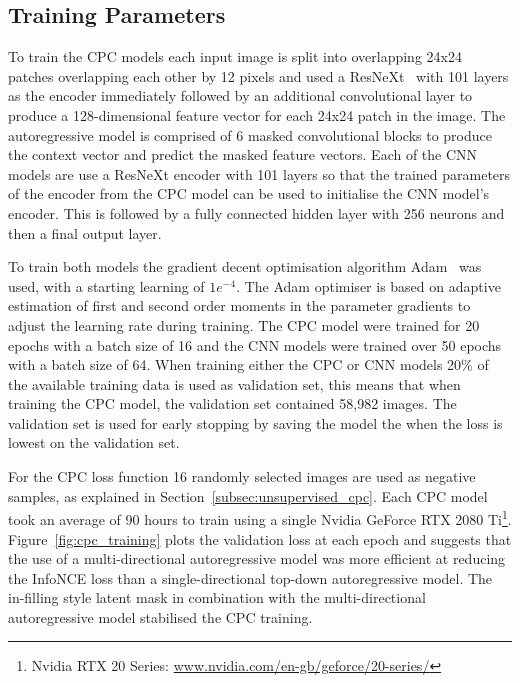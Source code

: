 \subsection{Training Parameters}
\label{subsec:unsupervised_training}
To train the CPC models each input image is split into overlapping 24x24 patches overlapping each other by 12 pixels and used a ResNeXt~\citep{xie2017aggregated} with 101 layers as the encoder immediately followed by an additional convolutional layer to produce a 128-dimensional feature vector for each 24x24 patch in the image. The autoregressive model is comprised of 6 masked convolutional blocks to produce the context vector and predict the masked feature vectors. Each of the CNN models are use a ResNeXt encoder with 101 layers so that the trained parameters of the encoder from the CPC model can be used to initialise the CNN model’s encoder. This is followed by a fully connected hidden layer with 256 neurons and then a final output layer.

To train both models the gradient decent optimisation algorithm Adam~\citep{kingma2014adam} was used, with a starting learning of $1e^{-4}$. The Adam optimiser is based on adaptive estimation of first and second order moments in the parameter gradients to adjust the learning rate during training. The CPC model were trained for 20 epochs with a batch size of 16 and the CNN models were trained over 50 epochs with a batch size of 64. When training either the CPC or CNN models 20\% of the available training data is used as validation set, this means that when training the CPC model, the validation set contained 58,982 images. The validation set is used for early stopping by saving the model the when the loss is lowest on the validation set. 

For the CPC loss function 16 randomly selected images are used as negative samples, as explained in Section~\ref{subsec:unsupervised_cpc}. Each CPC model took an average of 90 hours to train using a single Nvidia GeForce RTX 2080 Ti\footnote{Nvidia RTX 20 Series: \url{www.nvidia.com/en-gb/geforce/20-series/}}. Figure~\ref{fig:cpc_training} plots the validation loss at each epoch and suggests that the use of a multi-directional autoregressive model was more efficient at reducing the InfoNCE loss than a single-directional top-down autoregressive model. The in-filling style latent mask in combination with the multi-directional autoregressive model stabilised the CPC training.

